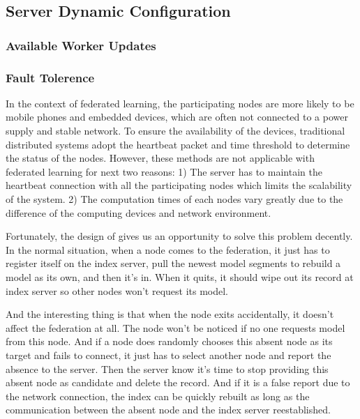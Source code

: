\subsection{Server Dynamic Configuration}

\subsubsection{Available Worker Updates}


\subsubsection{Fault Tolerence}
In the context of federated learning, the participating nodes are more likely to be mobile phones and embedded devices, which are often not connected to a power supply and stable network. To ensure the availability of the devices, traditional distributed systems adopt the heartbeat packet and time threshold to determine the status of the nodes. However, these methods are not applicable with federated learning for next two reasons: 1) The server has to maintain the heartbeat connection with all the participating nodes which limits the scalability of the system. 2) The computation times of each nodes vary greatly due to the difference of the computing devices and network environment.

Fortunately, the design of \sys gives us an opportunity to solve this problem decently. In the normal situation, when a node comes to the federation, it just has to register itself on the index server, pull the newest model segments to rebuild a model as its own, and then it's in. When it quits, it should wipe out its record at index server so other nodes won't request its model.

And the interesting thing is that when the node exits accidentally, it doesn't affect the federation at all. The node won't be noticed if no one requests model from this node. And if a node does randomly chooses this absent node as its target and fails to connect, it just has to select another node and report the absence to the server. Then the server know it's time to stop providing this absent node as candidate and delete the record. And if it is a false report due to the network connection, the index can be quickly rebuilt as long as the communication between the absent node and the index server reestablished. 